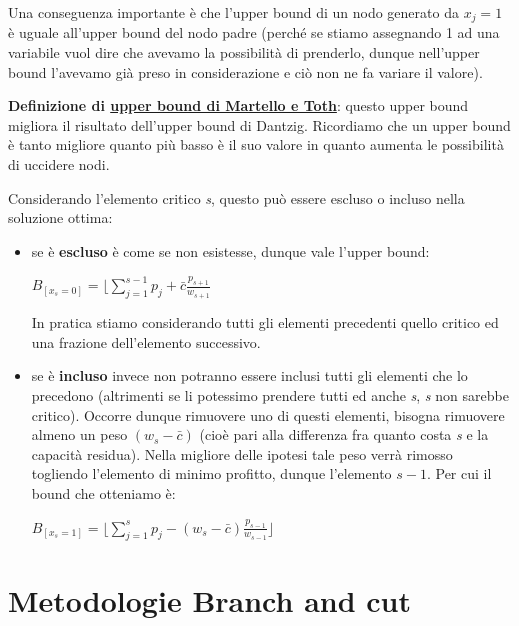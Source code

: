 \documentclass[11pt, oneside]{book}
\begin{document}
Una conseguenza importante \`e che l'upper bound di un nodo generato
da $x_j = 1$ \`e uguale all'upper bound del nodo padre (perch\'e se
stiamo assegnando 1 ad una variabile vuol dire che avevamo la
possibilit\`a di prenderlo, dunque nell'upper bound l'avevamo gi\`a
preso in considerazione e ci\`o non ne fa variare il valore).

\par\bigskip

{\bf Definizione di \underline{upper bound di Martello e Toth}}:
questo upper bound migliora il risultato dell'upper bound di
Dantzig. Ricordiamo che un upper bound \`e tanto migliore quanto pi\`u
basso \`e il suo valore in quanto aumenta le possibilit\`a di uccidere
nodi.

Considerando l'elemento critico {\em s}, questo pu\`o essere escluso o
incluso nella soluzione ottima:

\begin{itemize}
\item se \`e {\bf escluso} \`e come se non esistesse, dunque vale
  l'upper bound:

  \begin{center}
    $B_{[x_s = 0]} = \biggr\lfloor \sum\limits_{j=1}^{s-1} p_j + \bar{c}\frac{p_{s+1}}{w_{s+1}}$
  \end{center}

  In pratica stiamo considerando tutti gli elementi precedenti quello
  critico ed una frazione dell'elemento successivo. 

\item se \`e {\bf incluso} invece non potranno essere inclusi tutti
  gli elementi che lo precedono (altrimenti se li potessimo prendere
  tutti ed anche {\em s}, {\em s} non sarebbe critico). Occorre dunque
  rimuovere uno di questi elementi, bisogna rimuovere almeno un peso
  $(w_s - \bar{c})$ (cio\`e pari alla differenza fra quanto costa {\em
    s} e la capacit\`a residua). Nella migliore delle ipotesi tale
  peso verr\`a rimosso togliendo l'elemento di minimo profitto, dunque
  l'elemento $s-1$. Per cui il bound che otteniamo \`e: 

  \begin{center}
    $B_{[x_s=1]} = \biggr\lfloor \sum\limits_{j=1}^{s} p_j -
    (w_s-\bar{c})\frac{p_{s-1}}{w_{s-1}}\biggr\rfloor$
  \end{center}


\end{itemize}



\section{Metodologie Branch and cut}
\end{document}
